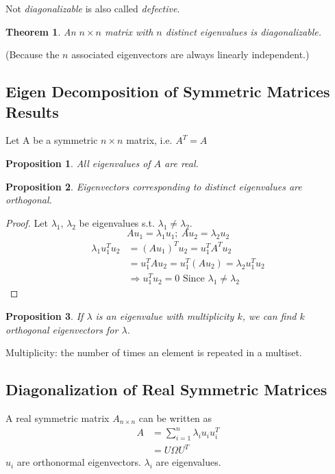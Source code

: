 \documentclass[11pt,a4paper]{article}
\newtheorem{theorem}{Theorem}
\newtheorem{proposition}{Proposition}
\begin{document}
Not \textit{diagonalizable} is also called \textit{defective}.

\begin{theorem}
    An $n\times n$ matrix with $n$ distinct eigenvalues is diagonalizable.
\end{theorem}
(Because the $n$ associated eigenvectors are always linearly independent.)


\subsection{Eigen Decomposition of Symmetric Matrices Results}
Let A be a symmetric $n\times n$ matrix, i.e. $A^T=A$
\begin{proposition}
All eigenvalues of $A$ are real.
\end{proposition}
\begin{proposition}
Eigenvectors corresponding to distinct eigenvalues are orthogonal.
\end{proposition}
\begin{proof}
\quad

Let $\lambda_1$, $\lambda_2$ be eigenvalues s.t. $\lambda_1\neq\lambda_2$.
$$Au_1=\lambda_1 u_1;\ Au_2=\lambda_2 u_2$$
\begin{equation}
    \begin{aligned}
        \lambda_1 u_1^Tu_2&=(Au_1)^Tu_2=u^T_1A^Tu_2\\
        &=u^T_1Au_2=u^T_1(Au_2)=\lambda_2 u^T_1u_2\\
        &\Rightarrow	u_1^Tu_2=0\text{ Since }\lambda_1\neq\lambda_2
    \end{aligned}
    \nonumber
\end{equation}
\end{proof}

\begin{proposition}
If $\lambda$ is an eigenvalue with multiplicity $k$, we can find $k$ orthogonal eigenvectors for $\lambda$.
\end{proposition}
Multiplicity: the number of times an element is repeated in a multiset.

\subsection{Diagonalization of Real Symmetric Matrices}
A real symmetric matrix $A_{n\times n}$ can be written as
\begin{equation}
    \begin{aligned}
        A&=\sum_{i=1}^n\lambda_i u_iu_i^T\\
        &=U\Omega U^T
    \end{aligned}
    \nonumber
\end{equation}
$u_i$ are orthonormal eigenvectors. $\lambda_i$ are eigenvalues.
\end{document}
